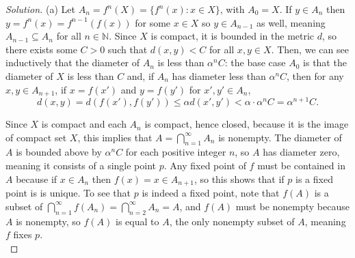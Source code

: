 \documentclass[10pt]{article}
\providecommand{\NN}{\mathbb N}
\newenvironment{soln}{\begin{proof}[Solution]}{\end{proof}}
\begin{document}
\begin{soln}
    (a) Let $A_n = f^n(X) = \{f^n(x) : x\in X\}$, with $A_0 = X$.
    If $y\in A_n$ then $y = f^n(x) = f^{n-1}(f(x))$ for some $x\in X$
    so $y\in A_{n-1}$ as well, meaning $A_{n-1}\subseteq A_n$
    for all $n\in\NN$. Since $X$ is compact, it is bounded in the metric $d$,
    so there exists some $C>0$ such that $d(x,y) < C$ for all $x,y\in X$.
    Then, we can see inductively that the diameter of $A_n$ is less than $\alpha^nC$:
    the base case $A_0$ is that the diameter of $X$ is less than $C$
    and, if $A_n$ has diameter less than $\alpha^nC$, then
    for any $x,y\in A_{n+1}$, if $x = f(x')$ and $y = f(y')$ for $x',y'\in A_n$,
    \begin{equation*}
	d(x,y) = d(f(x'), f(y')) \le \alpha d(x',y') < \alpha\cdot\alpha^nC
	= \alpha^{n+1}C.
    \end{equation*}

    Since $X$ is compact and each $A_n$ is compact, hence closed,
    because it is the image of compact set $X$,
    this implies that $A = \bigcap_{n=1}^\infty A_n$ is nonempty.
    The diameter of $A$ is bounded above by $\alpha^nC$ for each positive integer $n$,
    so $A$ has diameter zero, meaning it consists of a single point $p$.
    Any fixed point of $f$ must be contained in $A$ because
    if $x\in A_n$ then $f(x) = x\in A_{n+1}$, so this shows that
    if $p$ is a fixed point is is unique.
    To see that $p$ is indeed a fixed point,
    note that $f(A)$ is a subset of $\bigcap_{n=1}^\infty f(A_n) =
    \bigcap_{n=2}^\infty A_n = A$, and $f(A)$ must be nonempty
    because $A$ is nonempty, so $f(A)$ is equal to $A$,
    the only nonempty subset of $A$, meaning $f$ fixes $p$.
    \\


\end{soln}
\end{document}
